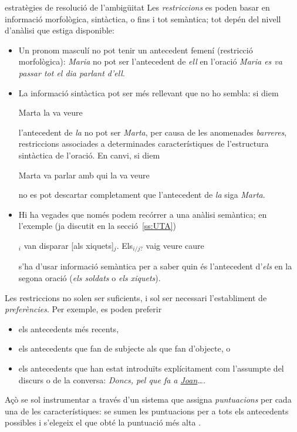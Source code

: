 \begin{persabermes}{estratègies de resolució de l'ambigüitat}
  Les \emph{restriccions} es poden basar en informació morfològica,
  sintàctica, o fins i tot semàntica; tot depén del nivell d'anàlisi
  que estiga disponible:
  \begin{itemize}
  \item Un pronom masculí no pot tenir un antecedent femení
    (restricció morfològica): \emph{Maria} no pot ser l'antecedent de
    \emph{ell} en l'oració \emph{Maria es va passar tot el dia parlant
      d'ell}.
  \item La informació sintàctica pot ser més rellevant que no ho
    sembla: si diem
    \begin{exemple}
      Marta la va veure
    \end{exemple} 
    l'antecedent de \emph{la} no pot ser \emph{Marta}, per causa de les anomenades \emph{barreres}, 
    restriccions associades a determinades característiques de
    l'estructura sintàctica de l'oració.
    En canvi, si diem
    \begin{exemple}
      Marta va parlar amb qui la va veure
    \end{exemple} 
    no es pot descartar completament que l'antecedent de \emph{la}
    siga \emph{Marta}.
  \item Hi ha vegades que només podem recórrer a una anàlisi
    semàntica; en l'exemple (ja discutit en la secció~\ref{ss:UTA})
    \begin{exemple} 
      $_i$ van disparar [als xiquets]$_j$. Els$_{i/j?}$
      vaig veure caure
    \end{exemple}
    s'ha d'usar informació semàntica per a saber quin és l'antecedent
    d'\emph{els} en la segona oració (\emph{els soldats} o \emph{els
      xiquets}).
  \end{itemize}

  Les restriccions no solen ser suficients, i sol ser necessari
  l'establiment de \emph{preferències}. Per exemple, es poden preferir
  \begin{itemize}
  \item els antecedents més recents,
  \item els antecedents que fan de subjecte als que fan d'objecte, o
  \item els antecedents que han estat introduïts explícitament com
    l'assumpte del discurs o de la conversa: \emph{Doncs, pel que fa a
      \underline{Joan}\ldots}.
  \end{itemize}
  Açò se sol instrumentar a través d'un sistema que assigna
  \emph{puntuacions} per cada una de les característiques: se sumen
  les puntuacions per a tots els antecedents possibles i s'elegeix el
  que obté la puntuació més alta \citep{lappin94j}.


\end{persabermes}
